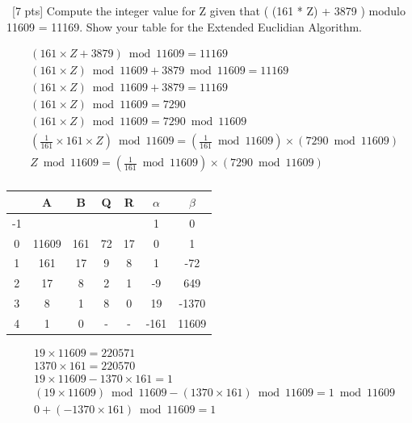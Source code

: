 \documentclass[12pt]{article}
\newenvironment{sol}[1][Solution]{\begin{trivlist}\item[\hskip\labelsep {\bfseries #1:}]}{\end{trivlist}}
\begin{document}
\begin{enumerate}
    \item \ [7 pts] Compute the integer value for Z given that ( (161 * Z) + 3879 ) modulo 11609 = 11169. Show your table for the Extended Euclidian Algorithm.
 \begin{sol}
    \begin{align*}
        & (161 \times Z + 3879) \bmod 11609 = 11169 \\
        & (161 \times Z) \bmod 11609 + 3879 \bmod 11609 = 11169 \\
        & (161 \times Z) \bmod 11609 + 3879 = 11169 \\
        & (161 \times Z) \bmod 11609 = 7290 \\ 
        & (161 \times Z) \bmod 11609 = 7290 \bmod 11609 \\ 
        & (\frac{1}{161}\times 161 \times Z) \bmod 11609 = (\frac{1}{161} \bmod 11609) \times (7290 \bmod 11609)\\
        & Z \bmod 11609 = (\frac{1}{161} \bmod 11609) \times (7290 \bmod 11609) \\
    \end{align*}
    \begin{center}
        \begin{tabular}{|c|c|c|c|c|c|c|}
        \hline
             & A & B & Q & R & $\alpha$ & $\beta$   \\
             \hline
        -1   &   &   &   &   &      1    &  0 \\
        \hline
        0    & 11609  &  161  & 72   & 17   &      0    &  1 \\
        \hline
        1    & 161   &  17  & 9 & 8 & 1 & -72 \\
        \hline
        2 & 17 & 8 & 2  & 1 & -9 & 649 \\
        \hline
        3 & 8 & 1 & 8 & 0 & 19 & -1370 \\
        \hline
        4 & 1 & 0 & - & - & -161 & 11609 \\
        \hline
        \end{tabular}
        \begin{align*}
            & 19 \times 11609 = 220571\\
            & 1370 \times 161 = 220570\\
            & 19 \times 11609 - 1370 \times 161 = 1\\
            & (19 \times 11609) \bmod 11609 - (1370 \times 161) \bmod 11609 =  1 \bmod 11609\\
            & 0+ (-1370 \times 161) \bmod 11609 = 1  \\

\end{align*}
\end{center}
\end{sol}
\end{enumerate}
\end{document}
